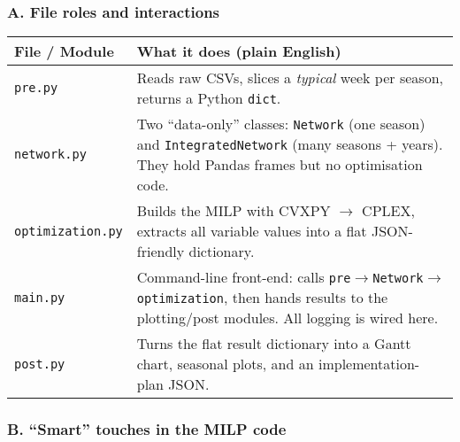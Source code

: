 \subsubsection*{A.  File roles and interactions}

\begin{center}\small
\begin{tabular}{p{3cm}p{9cm}}
\hline
\textbf{File / Module} & \textbf{What it does (plain English)} \\ 
\hline
\texttt{pre.py} & Reads raw CSVs, slices a \emph{typical} week per season, returns a Python \texttt{dict}. \\
\texttt{network.py} & Two “data-only” classes:  
\texttt{Network} (one season) and \texttt{IntegratedNetwork} (many seasons + years).  
They hold Pandas frames but no optimisation code. \\
\texttt{optimization.py} & Builds the MILP with CVXPY \(\rightarrow\) CPLEX, extracts all variable
values into a flat JSON-friendly dictionary. \\
\texttt{main.py} & Command-line front-end: calls \texttt{pre}\(\rightarrow\)\texttt{Network}\(\rightarrow\)\texttt{optimization},
then hands results to the plotting/post modules. All logging is wired here. \\
\texttt{post.py} & Turns the flat result dictionary into a Gantt chart, seasonal plots, and an implementation-plan JSON.\\
\hline
\end{tabular}
\end{center}

\subsubsection*{B.  “Smart” touches in the MILP code}

